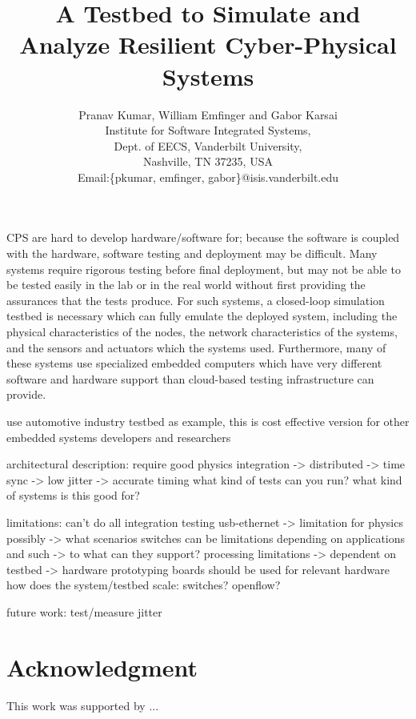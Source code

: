 \documentclass[conference]{IEEEtran}
\begin{document}
%
\title{A Testbed to Simulate and Analyze Resilient Cyber-Physical Systems}


\author{ Pranav Kumar, William Emfinger and Gabor Karsai \\
Institute for Software Integrated Systems,\\ Dept. of EECS, Vanderbilt University,\\
Nashville, TN 37235, USA \\
Email:\{pkumar, emfinger, gabor\}@isis.vanderbilt.edu}


\maketitle




CPS are hard to develop hardware/software for; because the software is coupled with the hardware, software testing and deployment may be difficult.  Many systems require rigorous testing before final deployment, but may not be able to be tested easily in the lab or in the real world without first providing the assurances that the tests produce.  For such systems, a closed-loop simulation testbed is necessary which can fully emulate the deployed system, including the physical characteristics of the nodes, the network characteristics of the systems, and the sensors and actuators which the systems used.  Furthermore, many of these systems use specialized embedded computers which have very different software and hardware support than cloud-based testing infrastructure can provide.  

use automotive industry testbed as example, this is cost effective version for other embedded systems developers and researchers

architectural description:
require good physics integration -> distributed -> time sync -> low jitter -> accurate timing
what kind of tests can you run?
what kind of systems is this good for?

limitations:
can't do all integration testing
usb-ethernet -> limitation for physics possibly -> what scenarios
switches can be limitations depending on applications and such -> to what can they support?
processing limitations -> dependent on testbed -> hardware prototyping boards should be used for relevant hardware
how does the system/testbed scale: switches? openflow?

future work:
test/measure jitter







\section*{Acknowledgment}

This work was supported by ... 


%
\end{document}
